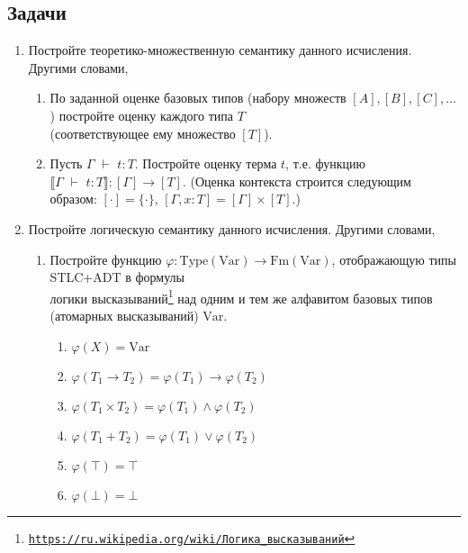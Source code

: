 \documentclass{article}
\DeclareMathOperator{\tstl}{\ \vdash\ }
\begin{document}
\subsection*{Задачи}
\begin{enumerate}
    \item Постройте теоретико-множественную семантику данного исчисления. Другими словами,
    \begin{enumerate}
        \item По заданной оценке базовых типов (набору множеств $[A],[B],[C],\ldots$) постройте оценку каждого типа $T$\\(соответствующее ему множество $[T]$).
        \item Пусть $\Gamma\tstl t:T$. Постройте оценку терма $t$, т.е. функцию $\llbracket \Gamma \tstl t : T\rrbracket: [\Gamma]\to[T]$.
        (Оценка контекста строится следующим образом: $[\cdot] = \{\cdot\}$, $[\Gamma,x:T]=[\Gamma]\times[T]$.)
    \end{enumerate}
    \newpage


    \item Постройте логическую семантику данного исчисления. Другими словами,
    \begin{enumerate}
        \item Постройте функцию $\varphi:\mathrm{Type}(\mathrm{Var})\to\mathrm{Fm}(\mathrm{Var})$, отображающую типы STLC+ADT в формулы \\
        логики высказываний\footnote{\href{https://ru.wikipedia.org/wiki/\%D0\%9B\%D0\%BE\%D0\%B3\%D0\%B8\%D0\%BA\%D0\%B0\_\%D0\%B2\%D1\%8B\%D1\%81\%D0\%BA\%D0\%B0\%D0\%B7\%D1\%8B\%D0\%B2\%D0\%B0\%D0\%BD\%D0\%B8\%D0\%B9}{\texttt{https://ru.wikipedia.org/wiki/Логика\_высказываний}}} над одним и тем же алфавитом базовых типов (атомарных высказываний) $\mathrm{Var}$.
    
        \begin{mdframed}
            \begin{enumerate}
                \item $\varphi (X) = \mathrm{Var}$
                \item $\varphi (T_1\to T_2) = \varphi(T_1)\to \varphi(T_2)$
                \item $\varphi (T_1\times T_2) = \varphi(T_1)\land \varphi(T_2)$
                \item $\varphi (T_1 + T_2) = \varphi(T_1)\lor \varphi(T_2)$
                \item $\varphi (\top) = \top$
                \item $\varphi(\bot) = \bot$
            \end{enumerate}
        \end{mdframed}


\end{enumerate}
\end{enumerate}
\end{document}
